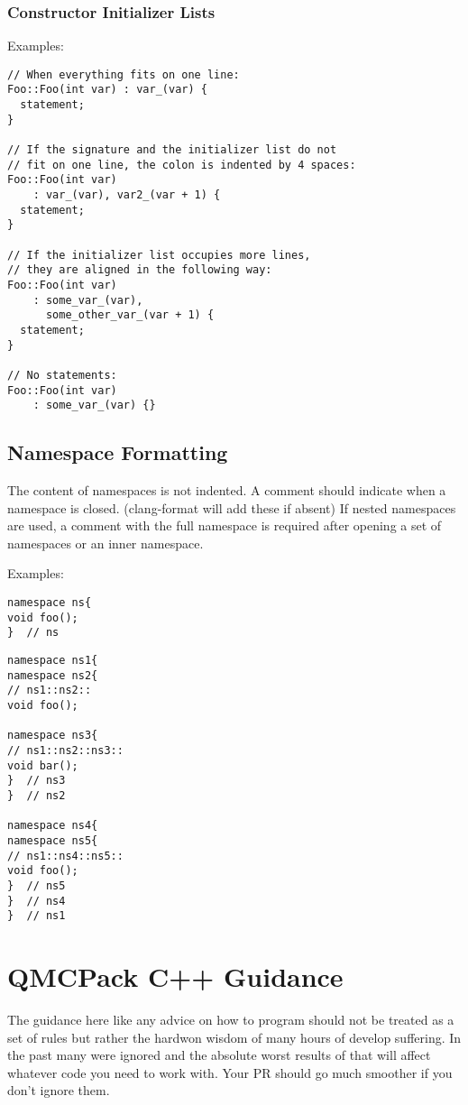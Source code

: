 \subsubsection{Constructor Initializer Lists}

Examples:
\begin{lstlisting}
// When everything fits on one line:
Foo::Foo(int var) : var_(var) {
  statement;
}

// If the signature and the initializer list do not
// fit on one line, the colon is indented by 4 spaces:
Foo::Foo(int var)
    : var_(var), var2_(var + 1) {
  statement;
}

// If the initializer list occupies more lines,
// they are aligned in the following way:
Foo::Foo(int var)
    : some_var_(var),
      some_other_var_(var + 1) {
  statement;
}

// No statements:
Foo::Foo(int var)
    : some_var_(var) {}
\end{lstlisting}

\subsection{Namespace Formatting}
The content of namespaces is not indented.
A comment should indicate when a namespace is closed. (clang-format will add these if absent)
If nested namespaces are used, a comment with the full namespace is required after opening a set of namespaces or an inner namespace.

Examples:
\begin{lstlisting}
namespace ns{
void foo();
}  // ns
\end{lstlisting}

\begin{lstlisting}
namespace ns1{
namespace ns2{
// ns1::ns2::
void foo();

namespace ns3{
// ns1::ns2::ns3::
void bar();
}  // ns3
}  // ns2

namespace ns4{
namespace ns5{
// ns1::ns4::ns5::
void foo();
}  // ns5
}  // ns4
}  // ns1
\end{lstlisting}


\section{QMCPack C++ Guidance}
The guidance here like any advice on how to program should not be treated as a set of rules but rather the hardwon wisdom of many hours of develop suffering. In the past many were ignored and the absolute worst results of that will affect whatever code you need to work with. Your PR should go much smoother if you don't ignore them.

